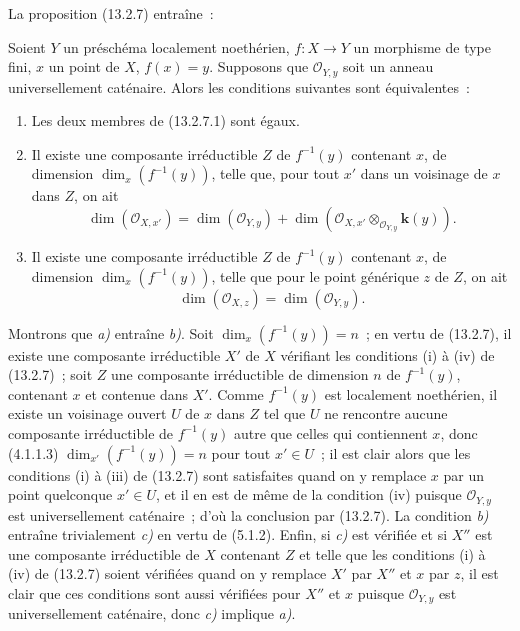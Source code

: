 La proposition (13.2.7) entraîne~:

\begin{corollary}[13.2.9]
\label{IV.13.2.9-fr}
Soient $Y$ un préschéma localement noethérien, $f:X\to Y$ un morphisme de type
fini, $x$ un point de $X$, $f(x)=y$. Supposons que $\mathcal O_{Y,y}$ soit un
anneau universellement caténaire. Alors les conditions suivantes sont
équivalentes~:
\begin{enumerate}[label=\emph{\alph*)}]
  \item Les deux membres de \textup{(13.2.7.1)} sont égaux.
  \item Il existe une composante irréductible $Z$ de $f^{-1}(y)$ contenant
  $x$, de dimension $\dim_x(f^{-1}(y))$, telle que, pour tout $x'$ dans un
  voisinage de $x$ dans $Z$, on ait
  \[
  \tag{13.2.9.1}
  \label{IV.13.2.9.1-fr}
    \dim(\mathcal O_{X,x'})=\dim(\mathcal O_{Y,y})
    +\dim(\mathcal O_{X,x'}\otimes_{\mathcal O_{Y,y}}\boldsymbol{k}(y)).
  \]
  \item Il existe une composante irréductible $Z$ de $f^{-1}(y)$ contenant
  $x$, de dimension $\dim_x(f^{-1}(y))$, telle que pour le point générique $z$
  de $Z$, on ait
  \[
  \tag{13.2.9.2}
  \label{IV.13.2.9.2-fr}
    \dim(\mathcal O_{X,z})=\dim(\mathcal O_{Y,y}).
  \]
\end{enumerate}
\end{corollary}

Montrons que \emph{a)} entraîne \emph{b)}. Soit $\dim_x(f^{-1}(y))=n$~; en vertu de
(13.2.7), il existe une composante irréductible $X'$ de $X$ vérifiant les
conditions (i) à (iv) de (13.2.7)~; soit $Z$ une composante irréductible de
dimension $n$ de $f^{-1}(y)$, contenant $x$ et contenue dans $X'$. Comme
$f^{-1}(y)$ est localement noethérien, il existe un voisinage ouvert $U$ de
$x$ dans $Z$ tel que $U$ ne rencontre aucune composante irréductible de
$f^{-1}(y)$ autre que celles qui contiennent $x$, donc (4.1.1.3)
$\dim_{x'}(f^{-1}(y))=n$ pour tout $x'\in U$~; il est clair alors que les
conditions (i) à (iii) de (13.2.7) sont satisfaites quand on y remplace $x$
par un point quelconque $x'\in U$, et il en est de même de la condition (iv)
puisque $\mathcal O_{Y,y}$ est universellement caténaire~; d'où la conclusion
par (13.2.7). La condition \emph{b)} entraîne trivialement \emph{c)} en vertu de
(5.1.2). Enfin, si \emph{c)} est vérifiée et si $X''$ est une composante
irréductible de $X$ contenant $Z$ et telle que les conditions (i) à (iv) de
(13.2.7) soient vérifiées quand on y remplace $X'$ par $X''$ et $x$ par $z$,
il est clair que ces conditions sont aussi vérifiées pour $X''$ et $x$ puisque
$\mathcal O_{Y,y}$ est universellement caténaire, donc \emph{c)} implique \emph{a)}.


